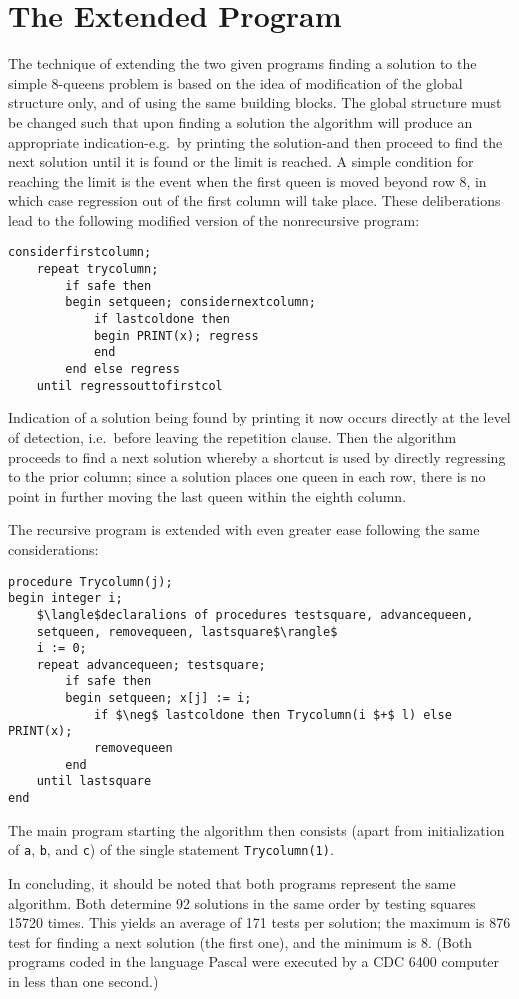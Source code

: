 \section{The Extended Program}

The technique of extending the two given programs finding a solution to the
simple 8-queens problem is based on the idea of modification of the global
structure only, and of using the same building blocks. The global structure
must be changed such that upon finding a solution the algorithm will produce an
appropriate indication-e.g.\ by printing the solution-and then proceed to find
the next solution until it is found or the limit is reached.  A simple
condition for reaching the limit is the event when the first queen is moved
beyond row 8, in which case regression out of the first column will take
place.  These deliberations lead to the following modified version of the
nonrecursive program:

\begin{lstlisting}
considerfirstcolumn;
    repeat trycolumn;
        if safe then
        begin setqueen; considernextcolumn;
            if lastcoldone then
            begin PRINT(x); regress
            end
        end else regress
    until regressouttofirstcol
\end{lstlisting}

Indication of a solution being found by printing it now occurs directly at
the level of detection, i.e.\ before leaving the repetition clause.  Then
the algorithm proceeds to find a next solution whereby a shortcut is used
by directly regressing to the prior column; since a solution places one
queen in each row, there is no point in further moving the last queen
within the eighth column.

The recursive program is extended with even greater ease following the same
considerations:

\begin{lstlisting}
procedure Trycolumn(j);
begin integer i;
    $\langle$declaralions of procedures testsquare, advancequeen,
    setqueen, removequeen, lastsquare$\rangle$
    i := 0;
    repeat advancequeen; testsquare;
        if safe then
        begin setqueen; x[j] := i;
            if $\neg$ lastcoldone then Trycolumn(i $+$ l) else PRINT(x);
            removequeen
        end
    until lastsquare
end
\end{lstlisting}

The main program starting the algorithm then consists (apart from
initialization of \verb|a|, \verb|b|, and \verb|c|) of the single statement
\verb|Trycolumn(1)|.

In concluding, it should be noted that both programs represent the same
algorithm. Both determine 92 solutions in the same order by testing squares
15720 times. This yields an average of 171 tests per solution; the maximum is
876 test for finding a next solution (the first one), and the minimum is 8.
(Both programs coded in the language Pascal were executed by a CDC 6400
computer in less than one second.)
